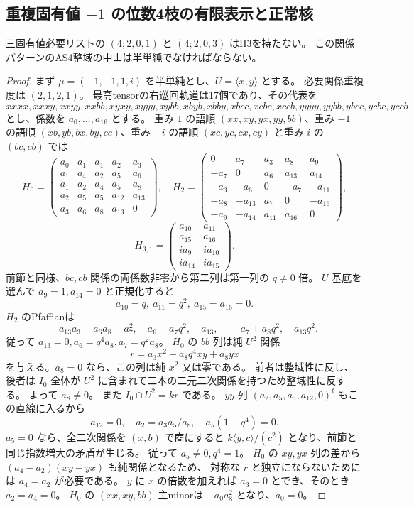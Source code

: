 \subsection{重複固有値 $-1$ の位数4枝の有限表示と正常核}
\label{subsec:cubic-fourth-root-negative-repeat-finite}
\begin{theorem}
\label{thm:cubic-fourth-root-negative-repeat-finite-empty}
三固有値必要リストの $(4;2,0,1)$ と $(4;2,0,3)$ はH3を持たない。
この関係パターンのAS4整域の中山は半単純でなければならない。
\end{theorem}
\begin{proof}
まず $\mu=(-1,-1,1,i)$ を半単純とし、$U=\langle x,y\rangle$ とする。
必要関係重複度は $(2,1,2,1)$。
最高tensorの右巡回軌道は17個であり、その代表を
\[
 xxxx,xxxy,xxyy,xxbb,xyxy,xyyy,xybb,xbyb,xbby,
 xbcc,xcbc,xccb,yyyy,yybb,ybcc,ycbc,yccb
\]
とし、係数を $a_0,\ldots,a_{16}$ とする。
重み $1$ の語順 $(xx,xy,yx,yy,bb)$、重み $-1$ の語順
$(xb,yb,bx,by,cc)$、重み $-i$ の語順 $(xc,yc,cx,cy)$ と重み $i$ の $(bc,cb)$ では
\[
 H_0=\begin{pmatrix}
 a_0&a_1&a_1&a_2&a_3\\
 a_1&a_4&a_2&a_5&a_6\\
 a_1&a_2&a_4&a_5&a_8\\
 a_2&a_5&a_5&a_{12}&a_{13}\\
 a_3&a_6&a_8&a_{13}&0
 \end{pmatrix},\quad
 H_2=\begin{pmatrix}
 0&a_7&a_3&a_8&a_9\\
 -a_7&0&a_6&a_{13}&a_{14}\\
 -a_3&-a_6&0&-a_7&-a_{11}\\
 -a_8&-a_{13}&a_7&0&-a_{16}\\
 -a_9&-a_{14}&a_{11}&a_{16}&0
 \end{pmatrix},
\]
\[
 H_{3,1}=\begin{pmatrix}a_{10}&a_{11}\\a_{15}&a_{16}\\
 ia_9&ia_{10}\\ia_{14}&ia_{15}\end{pmatrix}.
\]
前節と同様、$bc,cb$ 関係の両係数非零から第二列は第一列の $q\ne0$ 倍。
$U$ 基底を選んで $a_9=1,a_{14}=0$ と正規化すると
\[
 a_{10}=q,\ a_{11}=q^2,\ a_{15}=a_{16}=0.
\]
$H_2$ のPfaffianは
\[
 -a_{13}a_3+a_6a_8-a_7^2,\quad a_6-a_7q^2,\quad
 a_{13},\quad -a_7+a_8q^2,\quad a_{13}q^2.
\]
従って $a_{13}=0,a_6=q^4a_8,a_7=q^2a_8$。
$H_0$ の $bb$ 列は純 $U^2$ 関係
\[
 r=a_3x^2+a_8q^4xy+a_8yx
\]
を与える。$a_8=0$ なら、この列は純 $x^2$ 又は零である。
前者は整域性に反し、後者は $I_0$ 全体が $U^2$ に含まれて二本の二元二次関係を持つため整域性に反する。
よって $a_8\ne0$。
また $I_0\cap U^2=kr$ である。
$yy$ 列 $(a_2,a_5,a_5,a_{12},0)^t$ もこの直線に入るから
\[
 a_{12}=0,\quad a_2=a_3a_5/a_8,\quad a_5(1-q^4)=0.
\]
$a_5=0$ なら、全二次関係を $(x,b)$ で商にすると
$k\langle y,c\rangle/(c^2)$ となり、前節と同じ指数増大の矛盾が生じる。
従って $a_5\ne0,q^4=1$。
$H_0$ の $xy,yx$ 列の差から $(a_4-a_2)(xy-yx)$ も純関係となるため、
対称な $r$ と独立にならないためには $a_4=a_2$ が必要である。
$y$ に $x$ の倍数を加えれば $a_3=0$ とでき、そのとき $a_2=a_4=0$。
$H_0$ の $(xx,xy,bb)$ 主minorは $-a_0a_8^2$ となり、$a_0=0$。


\end{proof}

